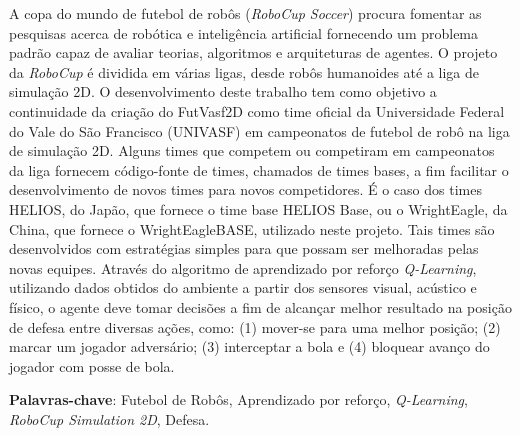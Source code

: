 \setlength{\absparsep}{18pt} %
\begin{resumo}

A copa do mundo de futebol de robôs (\textit{RoboCup Soccer}) procura fomentar as pesquisas acerca de robótica e inteligência artificial fornecendo um problema padrão capaz de avaliar teorias, algoritmos e arquiteturas de agentes. O projeto da \textit{RoboCup} é dividida em várias ligas, desde robôs humanoides até a liga de simulação 2D. O desenvolvimento deste trabalho tem como objetivo a continuidade da criação do FutVasf2D como time oficial da Universidade Federal do Vale do São Francisco (UNIVASF) em campeonatos de futebol de robô na liga de simulação 2D. Alguns times que competem ou competiram em campeonatos da liga fornecem código-fonte de times, chamados de times bases, a fim facilitar o desenvolvimento de novos times para novos competidores. É o caso dos times HELIOS, do Japão, que fornece o time base HELIOS Base, ou o WrightEagle, da China, que fornece o WrightEagleBASE, utilizado neste projeto. Tais times são desenvolvidos com estratégias simples para que possam ser melhoradas pelas novas equipes. Através do algoritmo de aprendizado por reforço \textit{Q-Learning}, utilizando dados obtidos do ambiente a partir dos sensores visual, acústico e físico, o agente deve tomar decisões a fim de alcançar melhor resultado na posição de defesa entre diversas ações, como: (1) mover-se para uma melhor posição; (2) marcar um jogador adversário; (3) interceptar a bola e (4) bloquear avanço do jogador com posse de bola.

 \textbf{Palavras-chave}: Futebol de Robôs, Aprendizado por reforço, \textit{Q-Learning}, \textit{RoboCup Simulation 2D}, Defesa.

\end{resumo}

